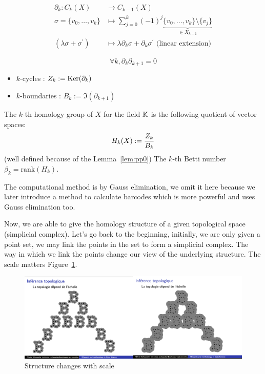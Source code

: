 \begin{definition}
  $$
  \begin{aligned}
  \partial_k: C_k(X) & \to C_{k-1}(X) \\
  \sigma=\{ v_0, \ldots, v_k \} & \mapsto \sum_{j=0}^k(-1)^j \underbrace{ \{v_0,\ldots,v_k \} \setminus \{v_j\}}_{\in X_{k-1}} \\
  \left(\lambda \sigma+\sigma^{\prime}\right) & \mapsto \lambda \partial_k \sigma+\partial_k \sigma^{\prime} \text{ (linear extension)}
  \end{aligned}
  $$
\end{definition}

\begin{lemma}
  $$
  \forall k, \partial_k \partial_{k+1} = 0
  $$
  \label{lem:pp0}
\end{lemma}

\begin{definition}
  \begin{itemize}
    \item $k$-cycles : $Z_k:=\operatorname{Ker}(\partial_k)$
    \item $k$-boundaries : $B_k:=\Im(\partial_{k+1})$
  \end{itemize}
  The $k$-th homology group of $X$ for the field $\mathbb{K}$ is the following quotient
  of vector spaces:
  $$
  H_k(X):={Z_k\over B_k}
  $$
  (well defined because of the Lemma~\ref{lem:pp0})
  The $k$-th Betti number $\beta_k = \mathrm{rank}(H_k)$.
\end{definition}
\RM The computational method is by Gauss elimination, we omit it here
because we later introduce a method to calculate barcodes which is more
powerful and uses Gauss elimination too.

Now, we are able to give the homology structure of a given topological space (simplicial complex).
Let's go back to the beginning, initially, we are only given a point set,
we may link the points in the set to form a simplicial complex.
The way in which we link the points change our view of the underlying structure.
The scale matters Figure~\ref{fig:scale}.

\begin{figure}[htbp]
\centering
\includegraphics[width=14cm]{scale.png}
\caption{Structure changes with scale}
\label{fig:scale}
\end{figure}

